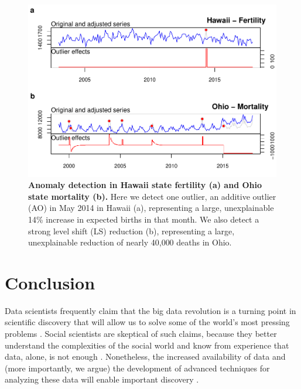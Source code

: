 \documentclass[12pt]{article}
\begin{document}
\begin{figure}
\centering
\includegraphics{manuscript_files/figure-latex/TrueAnomalies-1.pdf}
\caption{\textbf{Anomaly detection in Hawaii state fertility (a) and Ohio state mortality (b).}
Here we detect one outlier, an additive outlier (AO) in May 2014 in
Hawaii (a), representing a large, unexplainable 14\% increase in
expected births in that month. We also detect a strong level shift (LS)
reduction (b), representing a large, unexplainable reduction of nearly
40,000 deaths in Ohio. \label{fig:ferthawaii}}
\end{figure}

\hypertarget{conclusion}{%
\section{Conclusion}\label{conclusion}}

Data scientists frequently claim that the big data revolution is a
turning point in scientific discovery that will allow us to solve some
of the world's most pressing problems \citep{grimmer2015ppsp}. Social
scientists are skeptical of such claims, because they better understand
the complexities of the social world and know from experience that data,
alone, is not enough \citep{bohon2018demography, grimmer2015ppsp}.
Nonetheless, the increased availability of data and (more importantly,
we argue) the development of advanced techniques for analyzing these
data will enable important discovery \citep{monroe2015no}.
\end{document}
